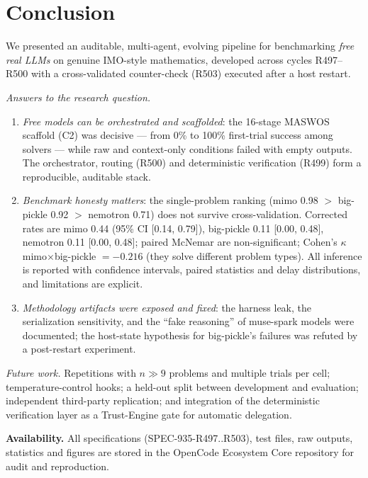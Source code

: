 \section{Conclusion}
\label{sec:conclusion}

We presented an auditable, multi-agent, evolving pipeline for benchmarking
\emph{free real LLMs} on genuine IMO-style mathematics, developed across
cycles R497--R500 with a cross-validated counter-check (R503) executed after
a host restart.

\emph{Answers to the research question.}
\begin{enumerate}
\item \emph{Free models can be orchestrated and scaffolded}: the 16-stage
MASWOS scaffold (C2) was decisive --- from 0\% to 100\% first-trial success
among solvers --- while raw and context-only conditions failed with empty
outputs. The orchestrator, routing (R500) and deterministic verification
(R499) form a reproducible, auditable stack.
\item \emph{Benchmark honesty matters}: the single-problem ranking
(mimo 0.98 $>$ big-pickle 0.92 $>$ nemotron 0.71) does not survive
cross-validation. Corrected rates are mimo 0.44 (95\% CI [0.14, 0.79]),
big-pickle 0.11 [0.00, 0.48], nemotron 0.11 [0.00, 0.48]; paired McNemar are
non-significant; Cohen's $\kappa$ mimo$\times$big-pickle $=-0.216$
(they solve different problem types). All inference is reported with
confidence intervals, paired statistics and delay distributions, and
limitations are explicit.
\item \emph{Methodology artifacts were exposed and fixed}: the harness leak,
the serialization sensitivity, and the ``fake reasoning'' of muse-spark
models were documented; the host-state hypothesis for big-pickle's failures
was refuted by a post-restart experiment.
\end{enumerate}

\emph{Future work.} Repetitions with $n \gg 9$ problems and multiple trials
per cell; temperature-control hooks; a held-out split between development
and evaluation; independent third-party replication; and integration of the
deterministic verification layer as a Trust-Engine gate for automatic
delegation.

\textbf{Availability.} All specifications (SPEC-935-R497..R503), test files,
raw outputs, statistics and figures are stored in the OpenCode Ecosystem
Core repository for audit and reproduction.